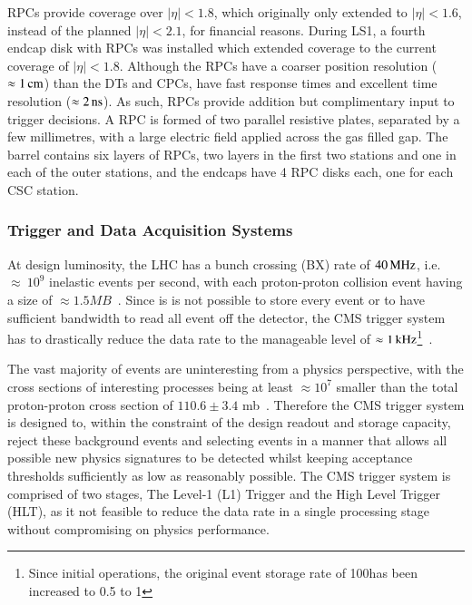 RPCs provide coverage over $|\eta| < 1.8$, which originally only extended to $|\eta| < 1.6$, instead of the planned $|\eta| < 2.1$, for financial reasons. 
During LS1, a fourth endcap disk with RPCs was installed which extended coverage to the current coverage of $|\eta| < 1.8$\cite{Battilana:2017mrm}.
Although the RPCs have a coarser position resolution ($\approx 1\,\text{cm}$) than the DTs and CPCs, have fast response times and excellent time resolution ($\approx 2\text{\,ns}$).
As such, RPCs provide addition but complimentary input to trigger decisions.
A RPC is formed of two parallel resistive plates, separated by a few millimetres, with a large electric field applied across the gas filled gap.
The barrel contains six layers of RPCs, two layers in the first two stations and one in each of the outer stations, and the endcaps have 4 RPC disks each, one for each CSC station.

\subsubsection{Trigger and Data Acquisition Systems}\label{subsubsec:trigger}
At design luminosity, the LHC has a bunch crossing (BX) rate of $40\text{\,MHz}$, i.e. $\approx~10^{9}$ inelastic events per second, with each proton-proton collision event having a size of $\approx 1.5MB$~\cite{Bayatian:2006nff}.
Since is is not possible to store every event or to have sufficient bandwidth to read all event off the detector, the CMS trigger system~\cite{Dasu:2000ge,Sphicas:2002gg} has to drastically reduce the data rate to the manageable level of $\approx 1\text{\,kHz}$\footnote{Since initial operations, the original event storage rate of 100\Hz has been increased to 0.5 to 1\kHz}~\cite{Dasu:2000ge,phase1L1TDR}.

The vast majority of events are uninteresting from a physics perspective, with the cross sections of interesting processes being at least $\approx 10^{7}$ smaller than the total proton-proton cross section of $110.6 \pm 3.4$ mb~\cite{Antchev:2017dia}.
Therefore the CMS trigger system is designed to, within the constraint of the design readout and storage capacity, reject these background events and selecting events in a manner that allows all possible new physics signatures to be detected whilst keeping acceptance thresholds sufficiently as low as reasonably possible.
The CMS trigger system is comprised of two stages, The Level-1 (L1) Trigger and the High Level Trigger (HLT), as it not feasible to reduce the data rate in a single processing stage without compromising on physics performance.

